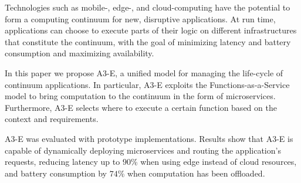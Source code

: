 
Technologies such as mobile-, edge-, and cloud-computing have the potential to form a computing continuum for new, disruptive applications. At run time, applications can choose to execute parts of their logic on different infrastructures that constitute the continuum, with the goal of minimizing latency and battery consumption and maximizing availability.

In this paper 
we propose A3-E, a unified model 
for managing the life-cycle of continuum applications. In particular, A3-E exploits the 
Functions-as-a-Service model to bring computation to the continuum in the form of microservices. Furthermore, A3-E selects where to execute a certain function based on the context and requirements.

A3-E was evaluated with prototype implementations. Results show that A3-E is capable of dynamically deploying microservices and routing the application's requests, reducing latency up to $90$\% when using edge instead of cloud resources, and battery consumption by $74$\% when computation has been offloaded.



